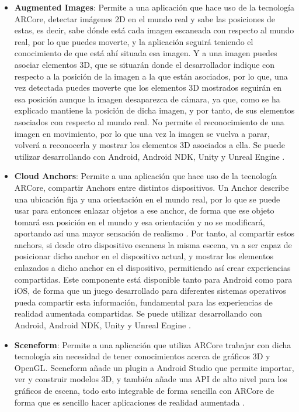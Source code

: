 \begin{itemize}
  \item \textbf{Augmented Images}: Permite a una aplicación que hace uso de la tecnología ARCore, detectar imágenes 2D en el mundo real y sabe las posiciones de estas, es decir, sabe dónde está cada imagen escaneada con respecto al mundo real, por lo que puedes moverte, y la aplicación seguirá teniendo el conocimiento de que está ahí situada esa imagen. Y a una imagen puedes asociar elementos 3D, que se situarán donde el desarrollador indique con respecto a la posición de la imagen a la que están asociados, por lo que, una vez detectada puedes moverte que los elementos 3D mostrados seguirán en esa posición aunque la imagen desaparezca de cámara, ya que, como se ha explicado mantiene la posición de dicha imagen, y por tanto, de sus elementos asociados con respecto al mundo real. No permite el reconocimiento de una imagen en movimiento, por lo que una vez la imagen se vuelva a parar, volverá a reconocerla y mostrar los elementos 3D asociados a ella. Se puede utilizar desarrollando con Android, Android NDK, Unity y Unreal Engine \cite{arcore-augmented-images}.

  \item \textbf{Cloud Anchors}: Permite a una aplicación que hace uso de la tecnología ARCore, compartir Anchors entre distintos dispositivos. Un Anchor describe una ubicación fija y una orientación en el mundo real, por lo que se puede usar para entonces enlazar objetos a ese anchor, de forma que ese objeto tomará esa posición en el mundo y esa orientación y no se modificará, aportando así una mayor sensación de realismo \cite{arcore-anchors}. Por tanto, al compartir estos anchors, si desde otro dispositivo escaneas la misma escena, va a ser capaz de posicionar dicho anchor en el dispositivo actual, y mostrar los elementos enlazados a dicho anchor en el dispositivo, permitiendo así crear experiencias compartidas. Este componente está disponible tanto para Android como para iOS, de forma que un juego desarrollado para diferentes sistemas operativos pueda compartir esta información, fundamental para las experiencias de realidad aumentada compartidas. Se puede utilizar desarrollando con Android, Android NDK, Unity y Unreal Engine \cite{arcore-cloud-anchors}.

  \item \textbf{Sceneform}: Permite a una aplicación que utiliza ARCore trabajar con dicha tecnología sin necesidad de tener conocimientos acerca de gráficos 3D y OpenGL. Sceneform añade un plugin a Android Studio que permite importar, ver y construir modelos 3D, y también añade una API de alto nivel para los gráficos de escena, todo esto integrable de forma sencilla con ARCore de forma que es sencillo hacer aplicaciones de realidad aumentada \cite{arcore-sceneform}.

\end{itemize}

